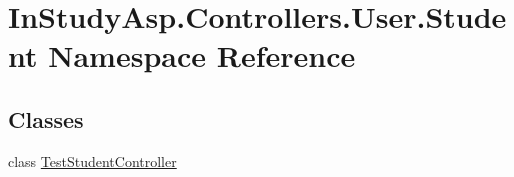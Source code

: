 \hypertarget{namespace_in_study_asp_1_1_controllers_1_1_user_1_1_student}{}\section{In\+Study\+Asp.\+Controllers.\+User.\+Student Namespace Reference}
\label{namespace_in_study_asp_1_1_controllers_1_1_user_1_1_student}
\subsection*{Classes}
\begin{DoxyCompactItemize}
\item 
class \hyperlink{class_in_study_asp_1_1_controllers_1_1_user_1_1_student_1_1_test_student_controller}{Test\+Student\+Controller}
\end{DoxyCompactItemize}
